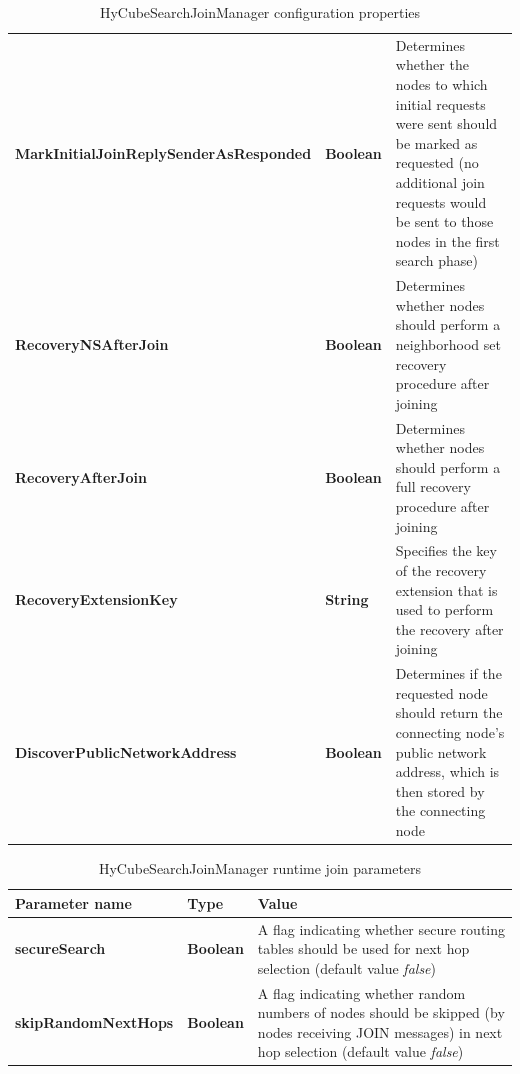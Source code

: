 \begin{table}
\begin{center}
\begin{tabular}{p{5cm} p{1.5cm} p{8.0cm}}
	\textbf{MarkInitialJoinReplySenderAsResponded}		& \textbf{Boolean}				& Determines whether the nodes to which initial requests were sent should be marked as requested (no additional join requests would be sent to those nodes in the first search phase) 			\\[1.5mm]	
	\textbf{RecoveryNSAfterJoin}						& \textbf{Boolean}				& Determines whether nodes should perform a neighborhood set recovery procedure after joining 			\\[1.5mm]	
	\textbf{RecoveryAfterJoin}							& \textbf{Boolean}				& Determines whether nodes should perform a full recovery procedure after joining 			\\[1.5mm]	
	\textbf{RecoveryExtensionKey}						& \textbf{String}				& Specifies the key of the recovery extension that is used to perform the recovery after joining 			\\[1.5mm]	
	\textbf{DiscoverPublicNetworkAddress}				& \textbf{Boolean}				& Determines if the requested node should return the connecting node's public network address, which is then stored by the connecting node		\\[1.5mm]
    \hline
\end{tabular}
\end{center}
\caption{HyCubeSearchJoinManager configuration properties}
\label{tab:libHyCubeSearchJoinManager}
\end{table}



\begin{table}
\scriptsize
\begin{center}
\begin{tabular}{p{2.5cm} p{2cm} p{10cm}}
	\hline
	\textbf{Parameter name}					& \textbf{Type}					& \textbf{Value}					\\[1mm]
    \hline
	\textbf{secureSearch}					& \textbf{Boolean}				& A flag indicating whether secure routing tables should be used for next hop selection (default value \emph{false})			\\[1.5mm]
	\textbf{skipRandomNextHops}				& \textbf{Boolean}				& A flag indicating whether random numbers of nodes should be skipped (by nodes receiving JOIN messages) in next hop selection (default value \emph{false})		\\[1.5mm]
    \hline
\end{tabular}
\end{center}
\caption{HyCubeSearchJoinManager runtime join parameters}
\label{tab:libHyCubeSearchJoinManagerJoinParameters}
\end{table}





